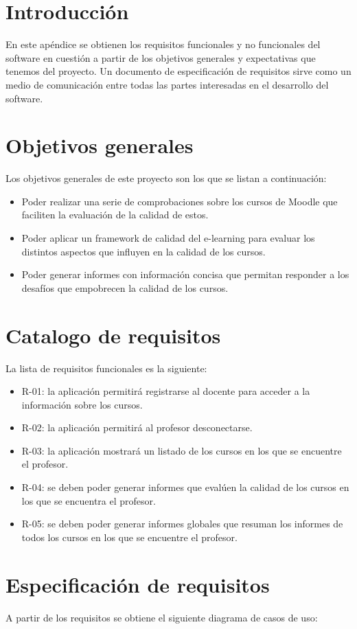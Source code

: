 \label{apendice:B}
\section{Introducción}
En este apéndice se obtienen los requisitos funcionales y no funcionales del software en cuestión a partir de los objetivos generales y expectativas que tenemos del proyecto. Un documento de especificación de requisitos sirve como un medio de comunicación entre todas las partes interesadas en el desarrollo del software.
\section{Objetivos generales}
	Los objetivos generales de este proyecto son los que se listan a continuación:
\begin{itemize}
	\item
	Poder realizar una serie de comprobaciones sobre los cursos de Moodle que faciliten la evaluación de la calidad de estos.
	\item
	Poder aplicar un framework de calidad del e-learning para evaluar los distintos aspectos que influyen en la calidad de los cursos.
	\item
	Poder generar informes con información concisa que permitan responder a los desafíos que empobrecen la calidad de los cursos.
\end{itemize}

\section{Catalogo de requisitos}
La lista de requisitos funcionales es la siguiente:
\begin{itemize}
	\item R-01: la aplicación permitirá registrarse al docente para acceder a la información sobre los cursos.
	\item R-02: la aplicación permitirá al profesor desconectarse.
	\item R-03: la aplicación mostrará un listado de los cursos en los que se encuentre el profesor.
	\item R-04: se deben poder generar informes que evalúen la calidad de los cursos en los que se encuentra el profesor.
	\item R-05: se deben poder generar informes globales que resuman los informes de todos los cursos en los que se encuentre el profesor.
\end{itemize}

\section{Especificación de requisitos}
A partir de los requisitos se obtiene el siguiente diagrama de casos de uso:


